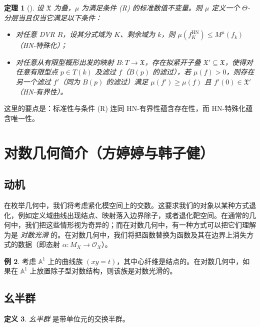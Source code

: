 \documentclass{amsart}
\newtheorem{thm}{定理}[section]
\theoremstyle{definition}
\newtheorem{defn}[thm]{定义}
\newtheorem{exm}[thm]{例}
\theoremstyle{remark}
\theoremstyle{plain}
\theoremstyle{definition}
\theoremstyle{remark}
\newcommand{\A}{\mathbb{A}}
\newcommand{\mc}[1]{\mathcal{#1}}
\newcommand{\mf}[1]{\mathfrak{#1}}
\newcommand{\mr}[1]{\mathrm{#1}}
\newcommand{\1}{\mathbf{1}}
\newcommand{\2}{\mathbf{2}}
\newcommand{\3}{\mathbf{3}}
\begin{document}
\begin{thm}[{\cite{HLinstability}}]
    设 \(\mf{X}\) 为叠，\(\mu\) 为满足条件 (R) 的标准数值不变量。则 \(\mu\) 定义一个 \(\Theta\)-分层当且仅当它满足以下条件：
    \begin{itemize}
        \item 对任意 DVR \(R\)，设其分式域为 \(K\)、剩余域为 \(k\)，则 \(\mu(f_K^{\mr{HN}}) \leq M^{\mu}(f_k)\)（HN-特殊化）；
        \item 对任意从有限型概形出发的映射 \(B \colon T \to \mf{X}\)，存在拟紧开子叠 \(\mf{X}' \subseteq \mf{X}\)，使得对任意有限型点 \(p \in T(k)\) 及滤过 \(f\)（\(B(p)\) 的滤过），若 \(\mu(f) > 0\)，则存在另一个滤过 \(f'\)（同为 \(B(p)\) 的滤过）满足 \(\mu(f') \geq \mu(f)\) 且 \(f'(0) \in \mf{X}'\)（HN-有界性）。
    \end{itemize}
\end{thm}

这里的要点是：标准性与条件 (R) 连同 HN-有界性蕴含存在性，而 HN-特殊化蕴含唯一性。




\section{对数几何简介（方婷婷与韩子健）}%
\label{sec:Intro to log geometry (Tingting Fang and Zijian Han)}

\subsection{动机}%
\label{sub:Motivation}

在枚举几何中，我们将考虑紧化模空间上的交数。这要求我们的对象以某种方式退化，例如定义域曲线出现结点、映射落入边界除子，或者退化靶空间。在通常的几何中，我们把这些情形视为奇异的；而在对数几何中，有一种方式可以把它们理解为是 \textit{对数光滑} 的。在对数几何中，我们将把函数替换为函数及其在边界上消失方式的数据（即态射 \(\alpha \colon M_X \to \mc{O}_X\)）。

\begin{exm}
    考虑 \(\A^1\) 上的曲线族 \((xy=t)\)，其中心纤维是结点的。在对数几何中，如果在 \(\A^1\) 上放置除子型对数结构，则该族是对数光滑的。
\end{exm}

\subsection{幺半群}%
\label{sub:Monoids}

\begin{defn}
    \textit{幺半群} 是带单位元的交换半群。 
\end{defn}
\end{document}
